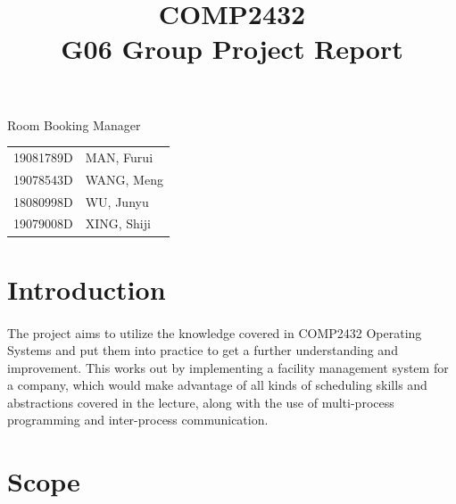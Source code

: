 \documentclass{article}
\title{\begin{center}\Huge COMP2432\\
    G06 Group Project Report\end{center}}
\date{}
\author{}
\begin{document}
    \begin{titlepage}
        \maketitle
        \begin{center}
            \huge Room Booking Manager
            \vfill
            \begin{table}[!htbp]
                \centering
                \huge
                \begin{tabular}{ll}
                    19081789D\hspace{0.25in}&MAN, Furui \\
                    19078543D\hspace{0.25in}&WANG, Meng \\
                    18080998D\hspace{0.25in}&WU, Junyu  \\
                    19079008D\hspace{0.25in}&XING, Shiji\\
                \end{tabular}
            \end{table}
            \vspace{0.5in}
            \thispagestyle{empty}
        \end{center}
    \end{titlepage}
    \cleardoublepage
    \tableofcontents
    \thispagestyle{empty}
    \cleardoublepage
    \setcounter{page}{1}
    \section{Introduction}
        \paragraph{}
        The project aims to utilize the knowledge covered in COMP2432 Operating Systems
        and put them into practice to get a further understanding and improvement. This
        works out by implementing a facility management system for a company, which
        would make advantage of all kinds of scheduling skills and abstractions covered
        in the lecture, along with the use of multi-process programming and inter-process
        communication. 
    \cleardoublepage
    \section{Scope}
\end{document}
